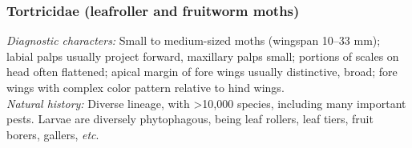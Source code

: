 \documentclass[letterpaper, 11pt]{article}
\begin{document}
\subsubsection{Tortricidae (leafroller and fruitworm moths)}
\noindent{}\textit{Diagnostic characters:} Small to medium-sized moths (wingspan 10--33 mm); labial palps usually project forward, maxillary palps small; portions of scales on head often flattened; apical margin of fore wings usually distinctive, broad; fore wings with complex color pattern relative to hind wings.\\

\noindent{}\textit{Natural history:} Diverse lineage, with \textgreater10,000 species, including many important pests. Larvae are diversely phytophagous, being leaf rollers, leaf tiers, fruit borers, gallers, \textit{etc}.
\end{document}

